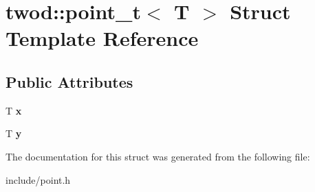 \hypertarget{structtwod_1_1point__t}{}\section{twod\+:\+:point\+\_\+t$<$ T $>$ Struct Template Reference}
\label{structtwod_1_1point__t}
\subsection*{Public Attributes}
\begin{DoxyCompactItemize}
\item 
\mbox{\label{structtwod_1_1point__t_a0fa47c3c4901082392966fe310b0bb36}} 
T {\bfseries x}
\item 
\mbox{\label{structtwod_1_1point__t_a2fd7bb8f932a1612f43b32aeffad806f}} 
T {\bfseries y}
\end{DoxyCompactItemize}


The documentation for this struct was generated from the following file\+:\begin{DoxyCompactItemize}
\item 
include/point.\+h\end{DoxyCompactItemize}
